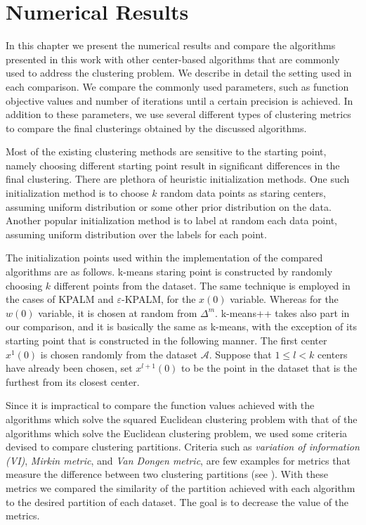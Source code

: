  \chapter{Numerical Results} \label{Chptr5}

\noindent \noindent \hrulefill

In this chapter we present the numerical results and compare the algorithms presented in this work with other center-based algorithms that are commonly used to address the clustering problem. We describe in detail the setting used in each comparison. We compare the commonly used parameters, such as function objective values and number of iterations until a certain precision is achieved. In addition to these parameters, we use several different types of clustering metrics to compare the final clusterings obtained by the discussed algorithms. 

\noindent \noindent \hrulefill

Most of the existing clustering methods are sensitive to the starting point, namely choosing different starting point result in significant differences in the final clustering. There are plethora of heuristic initialization methods. One such initialization method is to choose $k$ random data points as staring centers, assuming uniform distribution or some other prior distribution on the data. Another popular initialization method is to label at random each data point, assuming uniform distribution over the labels for each point. \medskip

The initialization points used within the implementation of the compared algorithms are as follows. k-means staring point is constructed by randomly choosing $k$ different points from the dataset. The same technique is employed in the cases of KPALM and $\varepsilon$-KPALM, for the $x(0)$ variable. Whereas for the $w(0)$ variable, it is chosen at random from $\Delta^m$. k-means++ takes also part in our comparison, and it is basically the same as k-means, with the exception of its starting point that is constructed in the following manner. The first center $x^1(0)$ is chosen randomly from the dataset $\mathcal{A}$. Suppose that $1 \leq l < k$ centers have already been chosen, set $x^{l+1}(0)$ to be the point in the dataset that is the furthest from its closest center.

Since it is impractical to compare the function values achieved with the algorithms which solve the squared Euclidean clustering problem with that of the algorithms which solve the Euclidean clustering problem, we used some criteria devised to compare clustering partitions. Criteria such as \textit{variation of information (VI)}, \textit{Mirkin metric}, and \textit{Van Dongen metric}, are few examples for metrics that measure the difference between two clustering partitions (see \cite{M2005}). With these metrics we compared the similarity of the partition achieved with each algorithm to the desired partition of each dataset. The goal is to decrease the value of the metrics.

